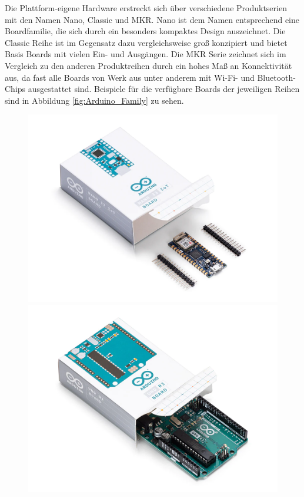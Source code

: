 \documentclass[
    load-dhbw-templates,
    load-preamble = true,
    auto-intro-pages = all,
    add-tocs-to-toc,
    debug = true,
    language = english,
    mainlanguage = ngerman,
    add-bibliography,
    bib-file = dhbw-source.bib,
    biblatex/style = numeric,
    print- = false
]{iodhbwm}
\begin{document}
        Die Plattform-eigene Hardware erstreckt sich über verschiedene Produktserien mit den Namen Nano, Classic und MKR. Nano ist dem Namen entsprechend eine Boardfamilie, die sich durch ein besonders kompaktes Design auszeichnet. Die Classic Reihe ist im Gegensatz dazu vergleichsweise groß konzipiert und bietet Basis Boards mit vielen Ein- und Ausgängen. Die MKR Serie zeichnet sich im Vergleich zu den anderen Produktreihen durch ein hohes Maß an Konnektivität aus, da fast alle Boards von Werk aus unter anderem mit Wi-Fi- und Bluetooth-Chips ausgestattet sind. Beispiele für die verfügbare Boards der jeweiligen Reihen sind in Abbildung \ref{fig:Arduino_Family} zu sehen. 

        \begin{figure}[!hbpt]
        \centering
        \begin{minipage}[t]{0.45\linewidth}
            \includegraphics[scale=0.5]{../Fotos/Arduino_Family/Nano_33_IoT.png}
        \end{minipage}
        \begin{minipage}[t]{0.45\linewidth}
            \includegraphics[scale=0.5]{../Fotos/Arduino_Family/Classic_UNO_R3.png}

\end{minipage}
\end{figure}
\end{document}
